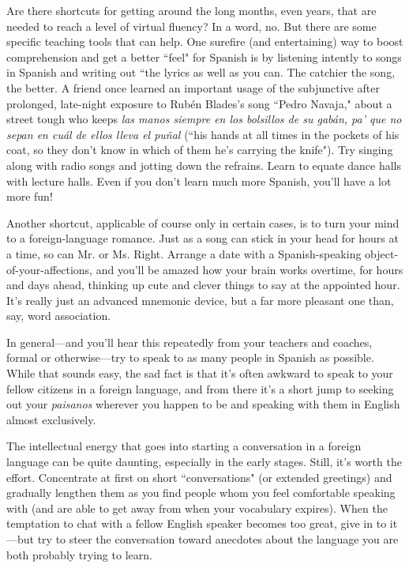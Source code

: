 Are there shortcuts for getting around the long months, even
years, that are needed to reach a level of virtual fluency? In a word, no.
But there are some specific teaching tools that can help. One surefire
(and entertaining) way to boost comprehension and get a better ``feel"
for Spanish is by listening intently to songs in Spanish and writing out
``the lyrics as well as you can. The catchier the song, the better. A friend
once learned an important usage of the subjunctive after prolonged,
late-night exposure to Rubén Blades's song ``Pedro Navaja," about a
street tough who keeps \emph{las manos siempre en los bolsillos de su gabán, pa' que no sepan en cuál de ellos lleva el puñal} (``his hands at all
times in the pockets of his coat, so they don't know in which of them
he's carrying the knife"). Try singing along with radio songs and jotting
down the refrains. Learn to equate dance halls with lecture halls. Even
if you don't learn much more Spanish, you'll have a lot more fun!

Another shortcut, applicable of course only in certain cases, is
to turn your mind to a foreign-language romance. Just as a song can
stick in your head for hours at a time, so can Mr. or Ms. Right. Arrange
a date with a Spanish-speaking object-of-your-affections, and you'll be
amazed how your brain works overtime, for hours and days ahead,
thinking up cute and clever things to say at the appointed hour. It's
really just an advanced mnemonic device, but a far more pleasant one
than, say, word association.

In general---and you'll hear this repeatedly from your teachers
and coaches, formal or otherwise---try to speak to as many people in
Spanish as possible. While that sounds easy, the sad fact is that it's often awkward to speak to your fellow citizens in a foreign language, and
from there it's a short jump to seeking out your \emph{paisanos} wherever you
happen to be and speaking with them in English almost exclusively.

The intellectual energy that goes into starting a conversation
in a foreign language can be quite daunting, especially in the early
stages. Still, it's worth the effort. Concentrate at first on short ``conversations" (or extended greetings) and gradually lengthen them as you
find people whom you feel comfortable speaking with (and are able to
get away from when your vocabulary expires). When the temptation
to chat with a fellow English speaker becomes too great, give in to
it---but try to steer the conversation toward anecdotes about the language you are both probably trying to learn.

